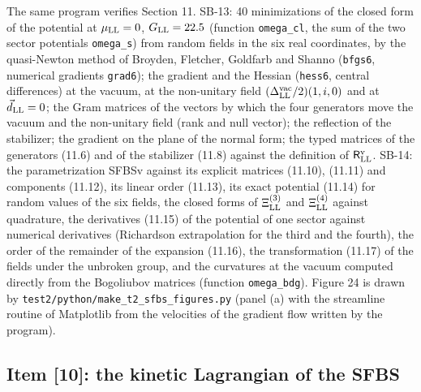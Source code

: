 \documentclass[
  10pt,
]{article}
\begin{document}
The same program verifies Section 11. SB-13: 40 minimizations of the
closed form of the potential at \(\mu_{\rm LL}=0\), \(G_{\rm LL}=22.5\)
(function \texttt{omega\_cl}, the sum of the two sector potentials
\texttt{omega\_s}) from random fields in the six real coordinates, by
the quasi-Newton method of Broyden, Fletcher, Goldfarb and Shanno
(\texttt{bfgs6}, numerical gradients \texttt{grad6}); the gradient and
the Hessian (\texttt{hess6}, central differences) at the vacuum, at the
non-unitary field \((\Delta^{\rm vac}_{\rm LL}/2)(1,i,0)\) and at
\(\vec d_{\rm LL}=0\); the Gram matrices of the vectors by which the
four generators move the vacuum and the non-unitary field (rank and null
vector); the reflection of the stabilizer; the gradient on the plane of
the normal form; the typed matrices of the generators (11.6) and of the
stabilizer (11.8) against the definition of
\(\mathsf R^{\rm v}_{\rm LL}\). SB-14: the parametrization SFBSv against
its explicit matrices (11.10), (11.11) and components (11.12), its
linear order (11.13), its exact potential (11.14) for random values of
the six fields, the closed forms of \(\Xi^{(3)}_{\rm LL}\) and
\(\Xi^{(4)}_{\rm LL}\) against quadrature, the derivatives (11.15) of
the potential of one sector against numerical derivatives (Richardson
extrapolation for the third and the fourth), the order of the remainder
of the expansion (11.16), the transformation (11.17) of the fields under
the unbroken group, and the curvatures at the vacuum computed directly
from the Bogoliubov matrices (function \texttt{omega\_bdg}). Figure 24
is drawn by \texttt{test2/python/make\_t2\_sfbs\_figures.py} (panel (a)
with the streamline routine of Matplotlib from the velocities of the
gradient flow written by the program).

\hypertarget{item-10-the-kinetic-lagrangian-of-the-sfbs}{%
\subsection{Item {[}10{]}: the kinetic Lagrangian of the
SFBS}\label{item-10-the-kinetic-lagrangian-of-the-sfbs}}
\end{document}
